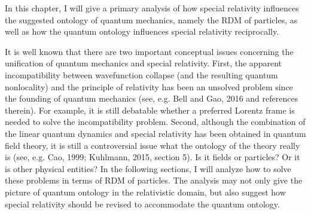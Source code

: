 In this chapter, I will give a primary analysis of how special relativity influences the suggested ontology of quantum mechanics, namely the RDM of particles, as well as how the quantum ontology influences special relativity reciprocally.

It is well known that there are two important conceptual issues concerning the unification of quantum mechanics and special relativity. First, the apparent incompatibility between wavefunction collapse (and the resulting quantum nonlocality) and the principle of relativity has been an unsolved problem since the founding of quantum mechanics (see, e.g. Bell and Gao, 2016 and references therein). For example, it is still debatable whether a preferred Lorentz frame is needed to solve the incompatibility problem. Second, although the combination of the linear quantum dynamics and special relativity has been obtained in quantum field theory, it is still a controversial issue what the ontology of the theory really is (see, e.g. Cao, 1999; Kuhlmann, 2015, section 5). Is it fields or particles? Or it is other physical entities?
In the following sections, I will analyze how to solve these problems in terms of RDM of particles. 
The analysis may not only give the picture of quantum ontology in the relativistic domain, but also suggest how special relativity should be revised to accommodate the quantum ontology.


